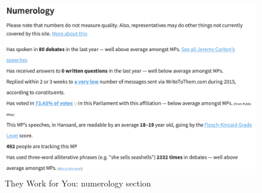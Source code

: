 \begin{figure}[h]
  \centering
  \includegraphics[scale=0.3]{images/they-work-for-you-numerology}
  \caption{They Work for You: numerology section}
  \label{fig:they-work-for-you-numerology}
\end{figure}